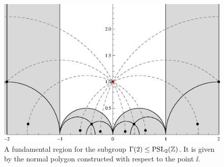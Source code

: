 \begin{figure}
\centering
\includegraphics[width=\textwidth]{figures/normpoly-gamma2-1}
\caption[A fundamental region $\Gamma(2)$]{A fundamental region for the subgroup $\Gamma(2) \le \operatorname{PSL}_{2}(\mathbb{Z})$. It is given by the normal polygon constructed with respect to the point $\ii$.}
\label{fig_Gamma2NormalPoly}
\end{figure}
